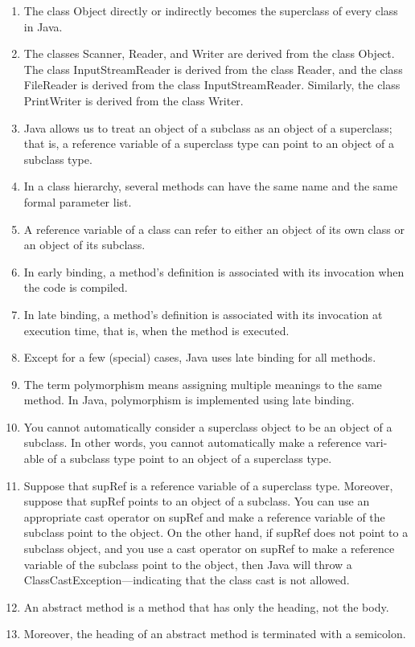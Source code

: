 \documentclass[12pt,a4paper,final,twoside,onecolumn,titlepage]{book}
\begin{document}
\begin{enumerate}
\item The class Object directly or indirectly becomes the superclass of every class in Java.
\item The classes Scanner, Reader, and Writer are derived from the class Object. The class InputStreamReader is derived from the class Reader, and the class FileReader is derived from the class InputStreamReader. Similarly, the class PrintWriter is derived from the class Writer.
\item Java allows us to treat an object of a subclass as an object of a superclass; that is, a reference variable of a superclass type can point to an object of a subclass type.
\item In a class hierarchy, several methods can have the same name and the same formal parameter list.
\item A reference variable of a class can refer to either an object of its own class or an object of its subclass.
\item In early binding, a method’s definition is associated with its invocation when the code is compiled.
\item In late binding, a method’s definition is associated with its invocation at execution time, that is, when the method is executed.
\item Except for a few (special) cases, Java uses late binding for all methods.
\item The term polymorphism means assigning multiple meanings to the same method. In Java, polymorphism is implemented using late binding.
\item You cannot automatically consider a superclass object to be an object of a subclass. In other words, you cannot automatically make a reference vari- able of a subclass type point to an object of a superclass type.
\item Suppose that supRef is a reference variable of a superclass type. Moreover, suppose that supRef points to an object of a subclass. You can use an appropriate cast operator on supRef and make a reference variable of the subclass point to the object. On the other hand, if supRef does not point to a subclass object, and you use a cast operator on supRef to make a reference variable of the subclass point to the object, then Java will throw a ClassCastException—indicating that the class cast is not allowed.
\item An abstract method is a method that has only the heading, not the body.
\item Moreover, the heading of an abstract method is terminated with a semicolon.

\end{enumerate}
\end{document}
